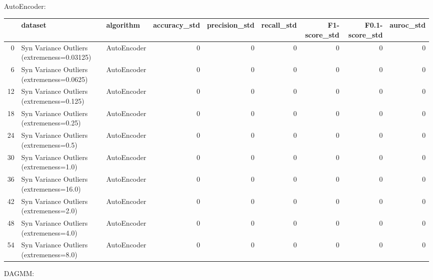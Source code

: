 AutoEncoder:

\begin{tabular}{rllrrrrrr}
\hline
    & dataset                                     & algorithm   &   accuracy\_std &   precision\_std &   recall\_std &   F1-score\_std &   F0.1-score\_std &   auroc\_std \\
\hline
  0 & Syn Variance Outliers (extremeness=0.03125) & AutoEncoder &              0 &               0 &            0 &              0 &                0 &           0 \\
  6 & Syn Variance Outliers (extremeness=0.0625)  & AutoEncoder &              0 &               0 &            0 &              0 &                0 &           0 \\
 12 & Syn Variance Outliers (extremeness=0.125)   & AutoEncoder &              0 &               0 &            0 &              0 &                0 &           0 \\
 18 & Syn Variance Outliers (extremeness=0.25)    & AutoEncoder &              0 &               0 &            0 &              0 &                0 &           0 \\
 24 & Syn Variance Outliers (extremeness=0.5)     & AutoEncoder &              0 &               0 &            0 &              0 &                0 &           0 \\
 30 & Syn Variance Outliers (extremeness=1.0)     & AutoEncoder &              0 &               0 &            0 &              0 &                0 &           0 \\
 36 & Syn Variance Outliers (extremeness=16.0)    & AutoEncoder &              0 &               0 &            0 &              0 &                0 &           0 \\
 42 & Syn Variance Outliers (extremeness=2.0)     & AutoEncoder &              0 &               0 &            0 &              0 &                0 &           0 \\
 48 & Syn Variance Outliers (extremeness=4.0)     & AutoEncoder &              0 &               0 &            0 &              0 &                0 &           0 \\
 54 & Syn Variance Outliers (extremeness=8.0)     & AutoEncoder &              0 &               0 &            0 &              0 &                0 &           0 \\
\hline
\end{tabular}

DAGMM:

